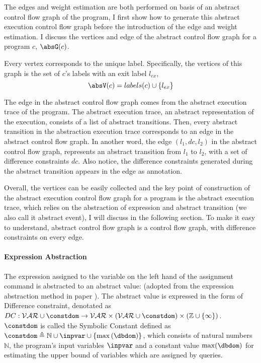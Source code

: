 The edges and weight estimation are both performed on basis of an abstract control flow graph of the program, I first show how to generate this abstract execution control flow graph before the introduction of  the edge and weight estimation.  
\label{sec:abscfg}
 I discuss the vertices and edge of the
abstract control flow graph for a program $c$, $\absG(c)$.

Every 
vertex corresponds to the unique
label.
Specifically,
the vertices of this graph is the set of $c$'s labels with an exit label $l_{ex}$, 
\[ 
  \absV(c) = labels(c)\cup\{l_{ex}\}
  \]

  The edge in the abstract control flow graph comes from the abstract execution trace of the program. 
  The abstract execution trace, an abstract representation of the execution, consists of a list of abstract transitions. 
  Then, every abstract transition in the abstraction execution trace corresponds to an edge in the abstract control flow graph. In another word, the edge $(l_1, dc, l_2)$ in the abstract control flow graph, represents an abstract transition 
 from $l_1$ to $l_2$, with a set of difference constraints $dc$. 
 Also notice, the difference constraints generated during the abstract transition appears in the edge as annotation.



  Overall, the vertices can be easily collected and the key point of construction of the abstract execution control flow graph for a program is the abstract execution trace, 
  which relies on the abstraction of expression and abstract transition (we also call it abstract event), I will discuss in the following section.
   To make it easy to understand, abstract control flow graph is a control flow graph, with difference constraints on every edge.

%
\paragraph*{Expression Abstraction}

The expression assigned to the variable on the left hand of the assignment command is abstracted to an abstract value: (adopted from the expression abstraction method in paper \cite{sinn2017complexity}). The abstract value is expressed in the form of Difference constraint, denotated as $DC : \mathcal{VAR} \cup \constdom \to \mathcal{\mathcal{VAR} \times (\mathcal{VAR} \cup \constdom) } \times (\mathbb{Z} \cup \{\infty\})$.  $\constdom$ is called the Symbolic Constant defined as $\constdom \triangleq \mathbb{N} \cup \inpvar \cup \{\max{(\dbdom)}\} $, which consists of 
natural numbers $\mathbb{N}$,
the program's input variables $\inpvar$  
and a constant value $\max(\dbdom)$ for estimating the upper bound of variables which are
assigned by queries. 

